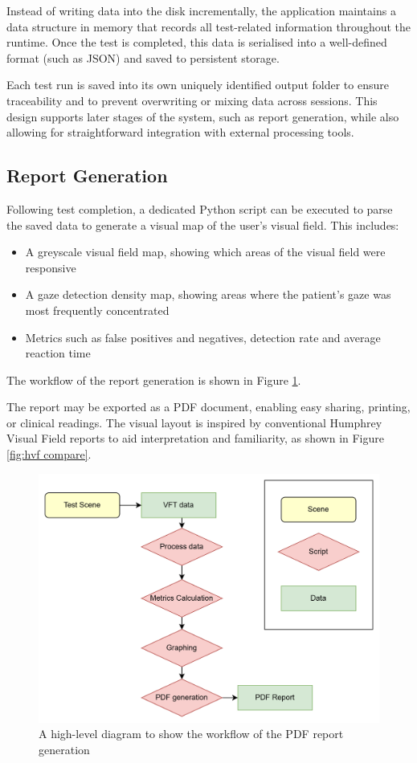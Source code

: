 \documentclass{l4proj}
\begin{document}
Instead of writing data into the disk incrementally, the application maintains a data structure in memory that records all test-related information throughout the runtime. Once the test is completed, this data is serialised into a well-defined format (such as JSON) and saved to persistent storage. 

Each test run is saved into its own uniquely identified output folder to ensure traceability and to prevent overwriting or mixing data across sessions. This design supports later stages of the system, such as report generation, while also allowing for straightforward integration with external processing tools. 

\subsection{Report Generation}
Following test completion, a dedicated Python script can be executed to parse the saved data to generate a visual map of the user's visual field. This includes: 

\begin{itemize}
    \item A greyscale visual field map, showing which areas of the visual field were responsive

    \item A gaze detection density map, showing areas where the patient’s gaze was most frequently concentrated

    \item Metrics such as false positives and negatives, detection rate and average reaction time
\end{itemize}

The workflow of the report generation is shown in Figure \ref{fig: report workflow}.

The report may be exported as a PDF document, enabling easy sharing, printing, or clinical readings. The visual layout is inspired by conventional Humphrey Visual Field reports to aid interpretation and familiarity, as shown in Figure \ref{fig:hvf compare}.

\begin{figure}[!h]
    \centering
    \includegraphics[width=0.75\linewidth]{images/Report Generation Workflow.png}
    \caption{A high-level diagram to show the workflow of the PDF report generation }
    \label{fig: report workflow}
\end{figure}
\end{document}
